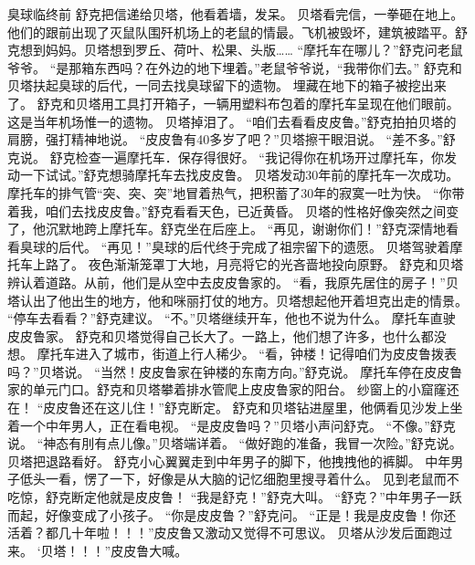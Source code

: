 \documentclass[a4paper,12pt,UTF8,twoside]{ctexbook}
\begin{document}
        臭球临终前 
        舒克把信递给贝塔，他看着墙，发呆。 
        贝塔看完信，一拳砸在地上。 
        他们的跟前出现了灭鼠队围歼机场上的老鼠的情最。飞机被毁坏，建筑被踏平。舒克想到妈妈。贝塔想到罗丘、荷叶、松果、头版…… 
        “摩托车在哪儿？”舒克问老鼠爷爷。 
        “是那箱东西吗？在外边的地下埋着。”老鼠爷爷说，“我带你们去。” 
        舒克和贝塔扶起臭球的后代，一同去找臭球留下的遗物。 
        埋藏在地下的箱子被挖出来了。 
        舒克和贝塔用工具打开箱子，一辆用塑料布包着的摩托车呈现在他们眼前。这是当年机场惟一的遗物。 
        贝塔掉泪了。 
        “咱们去看看皮皮鲁。”舒克拍拍贝塔的肩膀，强打精神地说。 
        “皮皮鲁有40多岁了吧？”贝塔擦干眼泪说。 
        “差不多。”舒克说。 
        舒克检查一遍摩托车．保存得很好。 
        “我记得你在机场开过摩托车，你发动一下试试。”舒克想骑摩托车去找皮皮鲁。 
        贝塔发动30年前的摩托车一次成功。 
        摩托车的排气管“突、突、突”地冒着热气，把积蓄了30年的寂寞一吐为快。 
        “你带着我，咱们去找皮皮鲁。”舒克看看天色，已近黄昏。 
        贝塔的性格好像突然之间变了，他沉默地跨上摩托车。舒克坐在后座上。 
        “再见，谢谢你们！”舒克深情地看看臭球的后代。 
        “再见！”臭球的后代终于完成了祖宗留下的遗愿。 
        贝塔驾驶着摩托车上路了。 
        夜色渐渐笼罩丁大地，月亮将它的光吝啬地投向原野。 
         舒克和贝塔辨认着道路。从前，他们是从空中去皮皮鲁家的。 
        “看，我原先居住的房子！”贝塔认出了他出生的地方，他和咪丽打仗的地方。贝塔想起他开着坦克出走的情景。 
        “停车去看看？”舒克建议。 
        “不。”贝塔继续开车，他也不说为什么。 
        摩托车直驶皮皮鲁家。 
        舒克和贝塔觉得自己长大了。一路上，他们想了许多，也什么都没想。 
        摩托车进入了城市，街道上行人稀少。 
        “看，钟楼！记得咱们为皮皮鲁拨表吗？”贝塔说。 
        “当然！皮皮鲁家在钟楼的东南方向。”舒克说。 
        摩托车停在皮皮鲁家的单元门口。舒克和贝塔攀着排水管爬上皮皮鲁家的阳台。 
        纱窗上的小窟窿还在！ 
        “皮皮鲁还在这儿住！”舒克断定。 
        舒克和贝塔钻进屋里，他俩看见沙发上坐着一个中年男人，正在看电视。 
        “是皮皮鲁吗？”贝塔小声问舒克。 
        “不像。”舒克说。 
        “神态有刖有点儿像。”贝塔端详着。 
        “做好跑的准备，我冒一次险。”舒克说。 
        贝塔把退路看好。 
        舒克小心翼翼走到中年男子的脚下，他拽拽他的裤脚。 
        中年男子低头一看，愣了一下，好像是从大脑的记忆细胞里搜寻着什么。 
        见到老鼠而不吃惊，舒克断定他就是皮皮鲁！ 
        “我是舒克！”舒克大叫。 
        “舒克？”中年男子一跃而起，好像变成了小孩子。 
        “你是皮皮鲁？”舒克问。 
        “正是！我是皮皮鲁！你还活着？都几十年啦！！！”皮皮鲁又激动又觉得不可思议。 
        贝塔从沙发后面跑过来。 
        ‘贝塔！！！”皮皮鲁大喊。 
\end{document}
